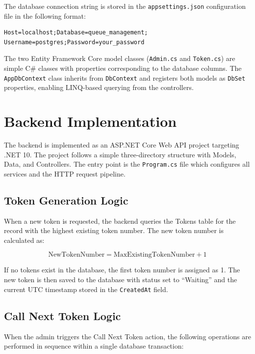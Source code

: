 The database connection string is stored in the \texttt{appsettings.json} configuration file in the following format:

\begin{verbatim}
Host=localhost;Database=queue_management;
Username=postgres;Password=your_password
\end{verbatim}

The two Entity Framework Core model classes (\texttt{Admin.cs} and \texttt{Token.cs}) are simple C\# classes with properties corresponding to the database columns. The \texttt{AppDbContext} class inherits from \texttt{DbContext} and registers both models as \texttt{DbSet} properties, enabling LINQ-based querying from the controllers.

\section{Backend Implementation}

The backend is implemented as an ASP.NET Core Web API project targeting .NET 10. The project follows a simple three-directory structure with Models, Data, and Controllers. The entry point is the \texttt{Program.cs} file which configures all services and the HTTP request pipeline.

\subsection{Token Generation Logic}

When a new token is requested, the backend queries the Tokens table for the record with the highest existing token number. The new token number is calculated as:

\begin{equation}
\text{NewTokenNumber} = \text{MaxExistingTokenNumber} + 1
\end{equation}

If no tokens exist in the database, the first token number is assigned as 1. The new token is then saved to the database with status set to ``Waiting'' and the current UTC timestamp stored in the \texttt{CreatedAt} field.

\subsection{Call Next Token Logic}

When the admin triggers the Call Next Token action, the following operations are performed in sequence within a single database transaction:

